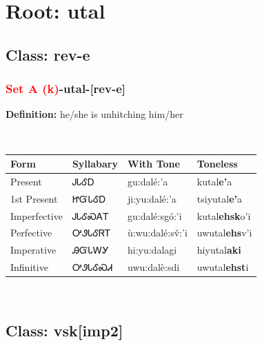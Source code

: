\needspace{4in}
\section*{Root: utal}
\nopagebreak
{}
\needspace{3in}
\subsection*{Class: rev-e}
\nopagebreak
\needspace{2in}
\subsubsection*{\textcolor{Red}{Set A (k)}{-}\textbf{utal}{-}[rev-e]}
\nopagebreak
\textbf{Definition: } he/she is unhitching him/her
\\[0.5em]
\begin{tabularx}{\textwidth}{l X X X}%
\toprule%
\textbf{Form}&\textbf{Syllabary}&\textbf{With Tone}&\textbf{Toneless}\\%
\midrule%
Present&ᎫᏓᎴᎠ&gu:dalé:’a&kutal\textbf{e'}a\\%
1st Present&ᏥᏳᏓᎴᎠ&ji:yu:dalé:’a&tsiyutal\textbf{e'}a\\%
Imperfective&ᎫᏓᎴᏍᎪᎢ&gu:dalé:sgó:’i&kutal\textbf{ehsk}o'i\\%
Perfective&ᎤᏭᏓᎴᏒᎢ&ù:wu:dalé:sv̌:’i&uwutal\textbf{ehs}v'i\\%
Imperative&ᎯᏳᏓᎳᎩ&hi:yu:dalagi&hiyutal\textbf{aki}\\%
Infinitive&ᎤᏭᏓᎴᏍᏗ&uwu:dalè:sdi&uwutal\textbf{ehst}i\\%
\bottomrule%
\end{tabularx}
\\[1em]
\needspace{3in}
\subsection*{Class: vsk[imp2]}
\nopagebreak
\needspace{2in}
